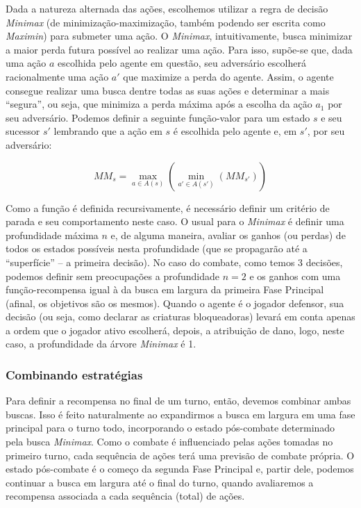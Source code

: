 Dada a natureza alternada das ações, escolhemos utilizar a regra de decisão \textit{Minimax} (de minimização-maximização, também podendo ser escrita como \textit{Maximin}) para submeter uma ação. O \textit{Minimax}, intuitivamente, busca minimizar a maior perda futura possível ao realizar uma ação. Para isso, supõe-se que, dada uma ação $a$ escolhida pelo agente em questão, seu adversário escolherá racionalmente uma ação $a'$ que maximize a perda do agente. Assim, o agente consegue realizar uma busca dentre todas as suas ações e determinar a mais ``segura'', ou seja, que minimiza a perda máxima após a escolha da ação $a_1$ por seu adversário. Podemos definir a seguinte função-valor para um estado $s$ e seu sucessor $s'$ lembrando que a ação em $s$ é escolhida pelo agente e, em $s'$, por seu adversário:

\begin{equation*}
  MM_s = \max\limits_{a \in A(s)}\left(\min\limits_{a' \in A(s')}\left(MM_{s'}\right)\right)
\end{equation*}

Como a função é definida recursivamente, é necessário definir um critério de parada e seu comportamento neste caso. O usual para o \textit{Minimax} é definir uma profundidade máxima $n$ e, de alguma maneira, avaliar os ganhos (ou perdas) de todos os estados possíveis nesta profundidade (que se propagarão até a ``superfície'' -- a primeira decisão). No caso do combate, como temos 3 decisões, podemos definir sem preocupações a profundidade $n = 2$ e os ganhos com uma função-recompensa igual à da busca em largura da primeira Fase Principal (afinal, os objetivos são os mesmos). Quando o agente é o jogador defensor, sua decisão (ou seja, como declarar as criaturas bloqueadoras) levará em conta apenas a ordem que o jogador ativo escolherá, depois, a atribuição de dano, logo, neste caso, a profundidade da árvore \textit{Minimax} é 1.

\subsubsection{Combinando estratégias}

Para definir a recompensa no final de um turno, então, devemos combinar ambas buscas. Isso é feito naturalmente ao expandirmos a busca em largura em uma fase principal para o turno todo, incorporando o estado pós-combate determinado pela busca \textit{Minimax}. Como o combate é influenciado pelas ações tomadas no primeiro turno, cada sequência de ações terá uma previsão de combate própria. O estado pós-combate é o começo da segunda Fase Principal e, partir dele, podemos continuar a busca em largura até o final do turno, quando avaliaremos a recompensa associada a cada sequência (total) de ações.

